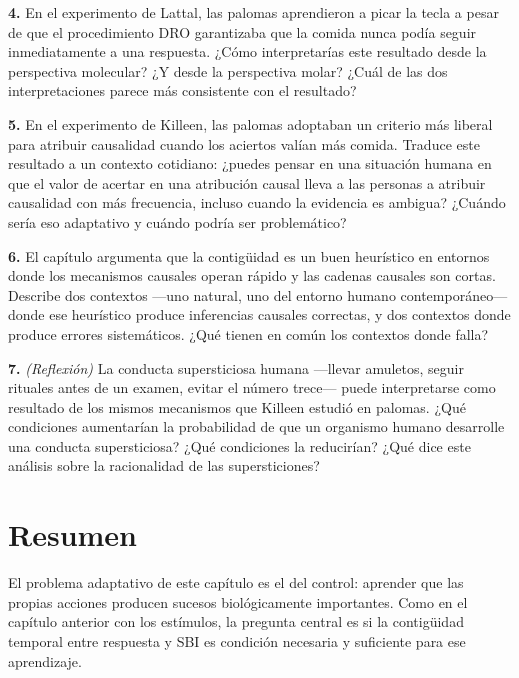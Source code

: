 \documentclass[
  letterpaper,
  DIV=11,
  numbers=noendperiod]{scrreprt}
\begin{document}
\begin{tcolorbox}[enhanced jigsaw, arc=.35mm, bottomrule=.15mm, breakable, colback=white, colframe=quarto-callout-note-color-frame, left=2mm, leftrule=.75mm, opacityback=0, rightrule=.15mm, toprule=.15mm]
\textbf{4.} En el experimento de Lattal, las palomas aprendieron a picar
la tecla a pesar de que el procedimiento DRO garantizaba que la comida
nunca podía seguir inmediatamente a una respuesta. ¿Cómo interpretarías
este resultado desde la perspectiva molecular? ¿Y desde la perspectiva
molar? ¿Cuál de las dos interpretaciones parece más consistente con el
resultado?

\textbf{5.} En el experimento de Killeen, las palomas adoptaban un
criterio más liberal para atribuir causalidad cuando los aciertos valían
más comida. Traduce este resultado a un contexto cotidiano: ¿puedes
pensar en una situación humana en que el valor de acertar en una
atribución causal lleva a las personas a atribuir causalidad con más
frecuencia, incluso cuando la evidencia es ambigua? ¿Cuándo sería eso
adaptativo y cuándo podría ser problemático?

\textbf{6.} El capítulo argumenta que la contigüidad es un buen
heurístico en entornos donde los mecanismos causales operan rápido y las
cadenas causales son cortas. Describe dos contextos ---uno natural, uno
del entorno humano contemporáneo--- donde ese heurístico produce
inferencias causales correctas, y dos contextos donde produce errores
sistemáticos. ¿Qué tienen en común los contextos donde falla?

\textbf{7.} \emph{(Reflexión)} La conducta supersticiosa humana
---llevar amuletos, seguir rituales antes de un examen, evitar el número
trece--- puede interpretarse como resultado de los mismos mecanismos que
Killeen estudió en palomas. ¿Qué condiciones aumentarían la probabilidad
de que un organismo humano desarrolle una conducta supersticiosa? ¿Qué
condiciones la reducirían? ¿Qué dice este análisis sobre la racionalidad
de las supersticiones?

\section{Resumen}\label{resumen-3}

El problema adaptativo de este capítulo es el del control: aprender que
las propias acciones producen sucesos biológicamente importantes. Como
en el capítulo anterior con los estímulos, la pregunta central es si la
contigüidad temporal entre respuesta y SBI es condición necesaria y
suficiente para ese aprendizaje.


\end{tcolorbox}
\end{document}
